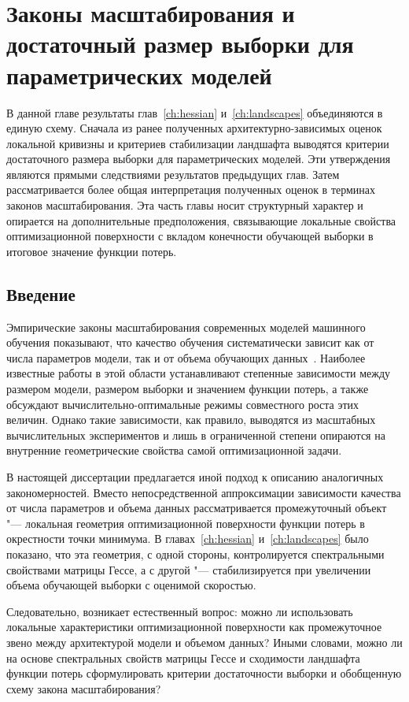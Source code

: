 \chapter{Законы масштабирования и достаточный размер выборки для параметрических моделей}\label{ch:scaling-laws}

В данной главе результаты глав~\ref{ch:hessian} и~\ref{ch:landscapes} объединяются в единую схему. Сначала из ранее полученных архитектурно-зависимых оценок локальной кривизны и критериев стабилизации ландшафта выводятся критерии достаточного размера выборки для параметрических моделей. Эти утверждения являются прямыми следствиями результатов предыдущих глав. Затем рассматривается более общая интерпретация полученных оценок в терминах законов масштабирования. Эта часть главы носит структурный характер и опирается на дополнительные предположения, связывающие локальные свойства оптимизационной поверхности с вкладом конечности обучающей выборки в итоговое значение функции потерь.

\section{Введение}

Эмпирические законы масштабирования современных моделей машинного обучения показывают, что качество обучения систематически зависит как от числа параметров модели, так и от объема обучающих данных~\cite{kaplan2020scaling,hoffmann2022chinchila}. Наиболее известные работы в этой области устанавливают степенные зависимости между размером модели, размером выборки и значением функции потерь, а также обсуждают вычислительно-оптимальные режимы совместного роста этих величин. Однако такие зависимости, как правило, выводятся из масштабных вычислительных экспериментов и лишь в ограниченной степени опираются на внутренние геометрические свойства самой оптимизационной задачи.

В настоящей диссертации предлагается иной подход к описанию аналогичных закономерностей. Вместо непосредственной аппроксимации зависимости качества от числа параметров и объема данных рассматривается промежуточный объект "--- локальная геометрия оптимизационной поверхности функции потерь в окрестности точки минимума. В главах~\ref{ch:hessian} и~\ref{ch:landscapes} было показано, что эта геометрия, с одной стороны, контролируется спектральными свойствами матрицы Гессе, а с другой "--- стабилизируется при увеличении объема обучающей выборки с оценимой скоростью.

Следовательно, возникает естественный вопрос: можно ли использовать локальные характеристики оптимизационной поверхности как промежуточное звено между архитектурой модели и объемом данных? Иными словами, можно ли на основе спектральных свойств матрицы Гессе и сходимости ландшафта функции потерь сформулировать критерии достаточности выборки и обобщенную схему закона масштабирования?


